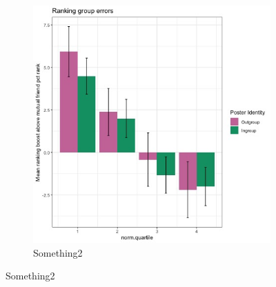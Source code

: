 \documentclass[12pt,letterpaper]{article}
\begin{document}
\begin{figure}[ht]
\begin{subfigure}{.5\textwidth}
        \includegraphics[width=1\linewidth]{Output/Graphs/Audit/Misranking relative to expectation/Mutual friends expectation/India PYMK by norm pref.jpg}  
        \caption{Something2}
        \label{fig:pymk_rankingboost_india}
    \end{subfigure}

\end{figure}
\end{document}
